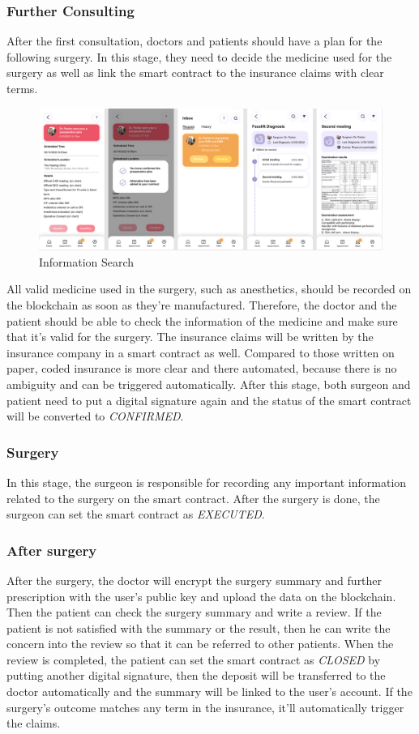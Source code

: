 \documentclass{article}
\begin{document}
\subsubsection{Further Consulting}
After the first consultation, doctors and patients should have a plan for the following surgery. In this stage, they need to decide the medicine used for the surgery as well as link the smart contract to the insurance claims with clear terms.
\begin{figure}[H]
    \centering
    \includegraphics[scale=0.5]{SecondConsulting.jpg}
    \caption{Information Search}
\end{figure}
All valid medicine used in the surgery, such as anesthetics, should be recorded on the blockchain as soon as they're manufactured. Therefore, the doctor and the patient should be able to check the information of the medicine and make sure that it's valid for the surgery. The insurance claims will be written by the insurance company in a smart contract as well. Compared to those written on paper, coded insurance is more clear and there automated, because there is no ambiguity and can be triggered automatically. After this stage, both surgeon and patient need to put a digital signature again and the status of the smart contract will be converted to \emph{CONFIRMED}.
\subsubsection{Surgery}
In this stage, the surgeon is responsible for recording any important information related to the surgery on the smart contract. After the surgery is done, the surgeon can set the smart contract as \emph{EXECUTED}.
\subsubsection{After surgery}
After the surgery, the doctor will encrypt the surgery summary and further prescription with the user's public key and upload the data on the blockchain. Then the patient can check the surgery summary and write a review. If the patient is not satisfied with the summary or the result, then he can write the concern into the review so that it can be referred to other patients. When the review is completed, the patient can set the smart contract as \emph{CLOSED} by putting another digital signature, then the deposit will be transferred to the doctor automatically and the summary will be linked to the user's account. If the surgery's outcome matches any term in the insurance, it'll automatically trigger the claims.
\end{document}
